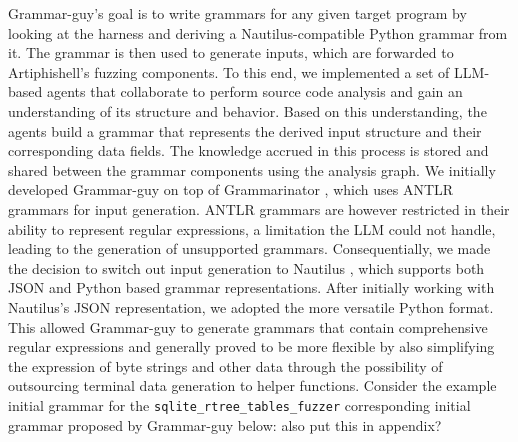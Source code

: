 Grammar-guy's goal is to write grammars for any given target program by looking at the harness and deriving a Nautilus-compatible Python grammar from it. The grammar is then used to generate inputs, which are forwarded to Artiphishell's fuzzing components.
To this end, we implemented a set of LLM-based agents that collaborate to perform source code analysis and gain an understanding of its structure and behavior. Based on this understanding, the agents build a grammar that represents the derived input structure and their corresponding data fields. The knowledge accrued in this process is stored and shared between the grammar components using the analysis graph.
We initially developed Grammar-guy on top of Grammarinator \cite{grammarinator}, which uses ANTLR grammars for input generation. ANTLR grammars are however restricted in their ability to represent regular expressions, a limitation the LLM could not handle, leading to the generation of unsupported grammars. Consequentially, we made the decision to switch out input generation to Nautilus \cite{nautilus}, which supports both JSON and Python based grammar representations. After initially working with Nautilus's JSON representation, we adopted the more versatile Python format. This allowed Grammar-guy to generate grammars that contain comprehensive regular expressions and generally proved to be more flexible by also simplifying the expression of byte strings and other data through the possibility of outsourcing terminal data generation to helper functions.
Consider the example initial grammar for the \verb|sqlite_rtree_tables_fuzzer| corresponding initial grammar proposed by Grammar-guy below:
\TBD also put this in appendix?

